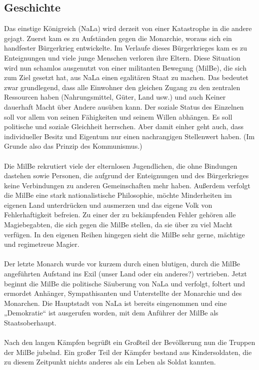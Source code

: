 \subsection{Geschichte}
Das einstige Königreich (NaLa) wird derzeit von einer Katastrophe in die andere gejagt.
Zuerst kam es zu Aufständen gegen die Monarchie, woraus sich ein handfester Bürgerkrieg entwickelte.
Im Verlaufe dieses Bürgerkrieges kam es zu Enteignungen und viele junge Menschen verloren ihre Eltern.
Diese Situation wird nun schamlos ausgenutzt von einer militanten Bewegung (MilBe), die sich zum Ziel gesetzt hat, aus NaLa einen egalitären Staat zu machen.
Das bedeutet zwar grundlegend, dass alle Einwohner den gleichen Zugang zu den zentralen Ressourcen haben (Nahrungsmittel, Güter, Land usw.) und auch Keiner dauerhaft Macht über Andere ausüben kann.
Der soziale Status des Einzelnen soll vor allem von seinen Fähigkeiten und seinem Willen abhängen.
Es soll politische und soziale Gleichheit herrschen.
Aber damit einher geht auch, dass individueller Besitz und Eigentum nur einen nachrangigen Stellenwert haben. (Im Grunde also das Prinzip des Kommunismus.)\\
\\
Die MilBe rekrutiert viele der elternlosen Jugendlichen, die ohne Bindungen dastehen sowie Personen, die aufgrund der Enteignungen und des Bürgerkrieges keine Verbindungen zu anderen Gemeinschaften mehr haben.
Außerdem verfolgt die MilBe eine stark nationalistische Philosophie, möchte Minderheiten im eigenen Land unterdrücken und ausmerzen und das eigene Volk von Fehlerhaftigkeit befreien.
Zu einer der zu bekämpfenden Fehler gehören alle Magiebegabten, die sich gegen die MilBe stellen, da sie über zu viel Macht verfügen.
In den eigenen Reihen hingegen sieht die MilBe sehr gerne, mächtige und regimetreue Magier.\\
\\
Der letzte Monarch wurde vor kurzem durch einen blutigen, durch die MilBe angeführten Aufstand ins Exil (unser Land oder ein anderes?) vertrieben.
Jetzt beginnt die MilBe die politische Säuberung von NaLa und verfolgt, foltert und ermordet Anhänger, Sympathisanten und Unterstellte der Monarchie und des Monarchen.
Die Hauptstadt von NaLa ist bereits eingenommen und eine „Demokratie“ ist ausgerufen worden, mit dem Anführer der MilBe als Staatsoberhaupt.\\
\\
Nach den langen Kämpfen begrüßt ein Großteil der Bevölkerung nun die Truppen der MilBe jubelnd.
Ein großer Teil der Kämpfer bestand aus Kindersoldaten, die zu diesem Zeitpunkt nichts anderes als ein Leben als Soldat kannten.
